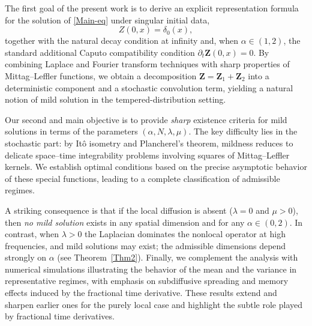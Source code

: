 \documentclass[12pt, reqno]{amsart}
\newcommand{\bz}{\ensuremath{\mathbf{Z}}}
\begin{document}
The first goal of the present work is to derive an explicit representation formula for the solution of
\eqref{Main-eq} under singular initial data,
\begin{equation}\label{eq:IC-Dirac}
Z(0,x)=\delta_0(x),
\end{equation}
together with the natural decay condition at infinity and, when $\alpha\in(1,2)$, the standard additional Caputo
compatibility condition $\partial_t \bz(0,x)=0$.
By combining Laplace and Fourier transform techniques with sharp properties of Mittag--Leffler functions, we obtain
a decomposition $\bz=\bz_1+\bz_2$ into a deterministic component and a stochastic convolution term, yielding a natural notion
of mild solution in the tempered-distribution setting.

Our second and main objective is to provide \emph{sharp} existence criteria for mild solutions in terms of the
parameters $(\alpha,N,\lambda,\mu)$.  The key difficulty lies in the stochastic part: by It\^o isometry and
Plancherel's theorem, mildness reduces to delicate space--time integrability problems involving squares of
Mittag--Leffler kernels.  We establish optimal conditions based on the precise asymptotic behavior of these special
functions, leading to a complete classification of admissible regimes.

A striking consequence is that if the local diffusion is absent ($\lambda=0$ and $\mu>0$), then \emph{no mild solution}
exists in any spatial dimension and for any $\alpha\in(0,2)$.  In contrast, when $\lambda>0$ the Laplacian dominates
the nonlocal operator at high frequencies, and mild solutions may exist; the admissible dimensions depend strongly on
$\alpha$ (see Theorem~\ref{Thm2}).
Finally, we complement the analysis with numerical simulations illustrating the behavior of the mean and the variance
in representative regimes, with emphasis on subdiffusive spreading and memory effects induced by the fractional time
derivative.
These results extend and sharpen earlier ones for the purely local case and highlight the subtle role played by fractional time derivatives.
\end{document}
